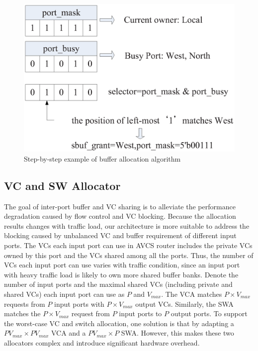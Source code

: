 \documentclass[paper]{ieice}
\begin{document}
\begin{figure}[h]
\centering\includegraphics[scale=0.5]{figures/Algorithm.eps}
\caption{Step-by-step example of buffer allocation algorithm}\label{Algorithm}
\end{figure}

\subsection{VC and SW Allocator}\label{allocmux}
The goal of inter-port buffer and VC sharing is to alleviate the performance degradation caused by flow control and VC blocking. Because the allocation results changes with traffic load, our architecture is more suitable to address the blocking caused by unbalanced VC and buffer requirement of different input ports. The VCs each input port can use in AVCS router includes the private VCs owned by this port and the VCs shared among all the ports. Thus, the number of VCs each input port can use varies with traffic condition, since an input port with heavy traffic load is likely to own more shared buffer banks. Denote the number of input ports and the maximal shared VCs (including private and shared VCs) each input port can use as $P$ and $V_{max}$. The VCA matches $P\times V_{max}$ requests from $P$ input ports with $P\times V_{max}$ output VCs. Similarly, the SWA matches the $P\times V_{max}$ request from $P$ input ports to $P$ output ports. To support the worst-case VC and switch allocation, one solution is that by adapting a $PV_{max}\times PV_{max}$ VCA and a $PV_{max}\times P$ SWA. However, this makes these two allocators complex and introduce significant hardware overhead.
\end{document}
